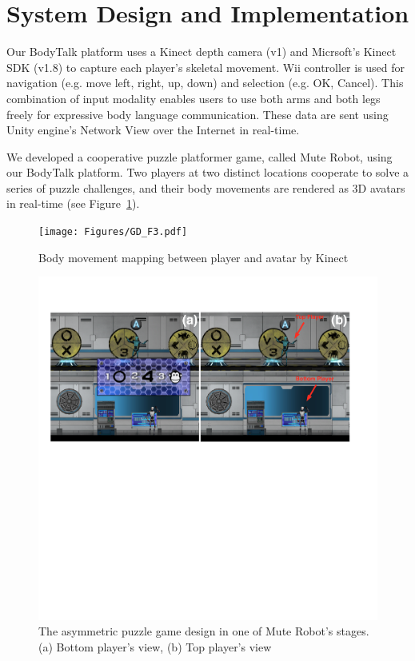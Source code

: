 \section{System Design and Implementation}


Our BodyTalk platform uses a Kinect depth camera (v1) and Micrsoft's Kinect SDK (v1.8) to capture each player's skeletal movement. 
Wii controller is used for navigation (e.g. move left, right, up, down) and selection (e.g. OK, Cancel). 
This combination of input modality enables users to use both arms and both legs freely for expressive body language communication.
These data are sent using Unity engine's\cite{unity} Network View over the Internet in real-time.

We developed a cooperative puzzle platformer game, called Mute Robot, using our BodyTalk platform. Two players at two distinct locations cooperate to solve a series of puzzle challenges, and their body movements are rendered as 3D avatars in real-time (see Figure~\ref{fig:GD_F3}). 


\begin{figure}[!t]
\centering
\texttt{[image: Figures/GD\_F3.pdf]}
\caption{Body movement mapping between player and avatar by Kinect}
\label{fig:GD_F3}
\end{figure}


\begin{figure}[!t]
\centering
\includegraphics[width=1.0\columnwidth]{Figures/GD_F2.pdf}
\caption{The asymmetric puzzle game design in one of Mute Robot's stages. (a) Bottom player's view, (b) Top player's view}
\label{fig:GD_F2}
\end{figure}


